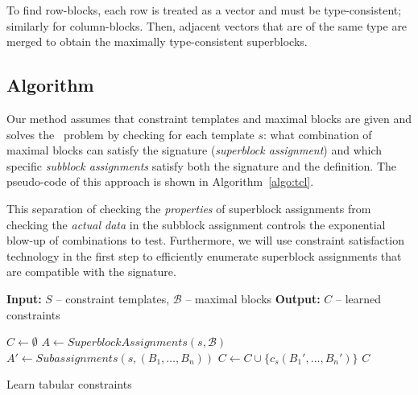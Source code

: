 \documentclass{IEEEtran}
\newcommand{\format}[1]{\textit{#1}\xspace}
\newcommand{\generategroups}{\format{SuperblockAssignments}}
\newcommand{\findassignment}{\format{Subassignments}}
\newcommand{\blocks}{\ensuremath{\mathcal{B}}\xspace}
\theoremstyle{definition}
\begin{document}
To find row-blocks, each row is treated as a vector and must be type-consistent; similarly for column-blocks. Then, adjacent vectors that are of the same type are merged to obtain the maximally type-consistent superblocks.


\subsection{Algorithm}
\label{sec:algo}
Our method assumes that constraint templates and maximal blocks are given and solves the \tcl~problem by checking for each template $s$: what combination of maximal blocks can satisfy the signature (\textit{superblock assignment}) and which specific \textit{subblock assignments} satisfy both the signature and the definition.
The pseudo-code of this approach is shown in Algorithm~\ref{algo:tcl}.


This separation of checking the \textit{properties} of superblock assignments from checking the \textit{actual data} in the subblock assignment controls the exponential blow-up of combinations to test. Furthermore, we will use constraint satisfaction technology in the first step to efficiently enumerate superblock assignments that are compatible with the signature. %

\newcommand{\temps}{\ensuremath{S}}
\begin{algorithm}[t]
  \begin{algorithmic}[1]
    \footnotesize
    \State \textbf{Input:} $\temps$ -- constraint templates, $\blocks$ -- maximal blocks
    \State \textbf{Output:} $C$ -- learned constraints

    \Procedure{LearnConstraints}{$\blocks$, $\temps$}
      \State $C \gets \emptyset$ %
      \ForAll{$s~\mathbf{in}~\temps$}
        \State $A \gets \generategroups(s, \blocks)$
        \State $A' \gets \findassignment(s, (B_1,\dots,B_n))$
            \State $C \gets C \cup \{ c_s(B_1', \dots, B_n') \}$
          \EndFor
        \EndFor
      \EndFor
      \State \Return $C$
    \EndProcedure
\end{algorithmic}
\caption{Learn tabular constraints}
\label{algo:tcl}
\end{algorithm}
\end{document}
